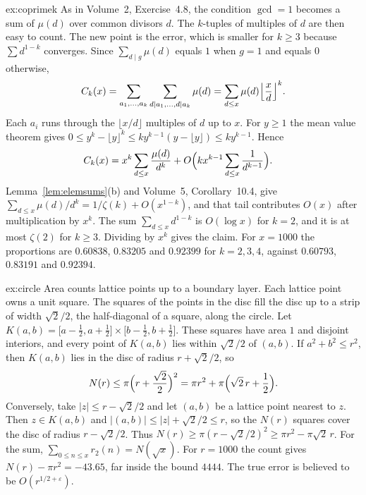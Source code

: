 \begin{solution}{ex:coprimek}
\idea As in Volume~2, Exercise~4.8, the condition $\gcd=1$ becomes a sum of $\mu(d)$ over common divisors $d$. The $k$-tuples of multiples of $d$ are then easy to count. The new point is the error, which is smaller for $k\ge3$ because $\sum d^{1-k}$ converges.
\writeup Since $\sum_{d\mid g}\mu(d)$ equals $1$ when $g=1$ and equals $0$ otherwise,
\[
C_k(x)=\sum_{a_1,\dots,a_k}\sum_{d\mid a_1,\dots,d\mid a_k}\mu(d)=\sum_{d\le x}\mu(d)\Bigl\lfloor\frac xd\Bigr\rfloor^k.
\]
Each $a_i$ runs through the $\lfloor x/d\rfloor$ multiples of $d$ up to $x$. For $y\ge1$ the mean value theorem gives $0\le y^k-\lfloor y\rfloor^k\le ky^{k-1}(y-\lfloor y\rfloor)\le ky^{k-1}$. Hence
\[
\begin{aligned}C_k(x)&=x^k\sum_{d\le x}\frac{\mu(d)}{d^k}+O\Bigl(kx^{k-1}\sum_{d\le x}\frac1{d^{k-1}}\Bigr).\end{aligned}
\]
Lemma~\ref{lem:elemsums}(b) and Volume~5, Corollary~10.4, give $\sum_{d\le x}\mu(d)/d^k=1/\zeta(k)+O(x^{1-k})$, and that tail contributes $O(x)$ after multiplication by $x^k$. The sum $\sum_{d\le x}d^{1-k}$ is $O(\log x)$ for $k=2$, and it is at most $\zeta(2)$ for $k\ge3$. Dividing by $x^k$ gives the claim. For $x=1000$ the proportions are $0.60838$, $0.83205$ and $0.92399$ for $k=2,3,4$, against $0.60793$, $0.83191$ and $0.92394$.
\end{solution}

\begin{solution}{ex:circle}
\idea Area counts lattice points up to a boundary layer. Each lattice point owns a unit square. The squares of the points in the disc fill the disc up to a strip of width $\sqrt2/2$, the half-diagonal of a square, along the circle.
\writeup Let $K(a,b)=\bigl[a-\frac12,a+\frac12\bigr]\times\bigl[b-\frac12,b+\frac12\bigr]$. These squares have area $1$ and disjoint interiors, and every point of $K(a,b)$ lies within $\sqrt2/2$ of $(a,b)$. If $a^2+b^2\le r^2$, then $K(a,b)$ lies in the disc of radius $r+\sqrt2/2$, so
\[
N(r)\le\pi\Bigl(r+\frac{\sqrt2}2\Bigr)^2=\pi r^2+\pi\Bigl(\sqrt2\,r+\frac12\Bigr).
\]
Conversely, take $|z|\le r-\sqrt2/2$ and let $(a,b)$ be a lattice point nearest to $z$. Then $z\in K(a,b)$ and $|(a,b)|\le|z|+\sqrt2/2\le r$, so the $N(r)$ squares cover the disc of radius $r-\sqrt2/2$. Thus $N(r)\ge\pi(r-\sqrt2/2)^2\ge\pi r^2-\pi\sqrt2\,r$. For the sum, $\sum_{0\le n\le x}r_2(n)=N(\sqrt x)$. For $r=1000$ the count gives $N(r)-\pi r^2=-43.65$, far inside the bound $4444$. The true error is believed to be $O(r^{1/2+\varepsilon})$.
\end{solution}

